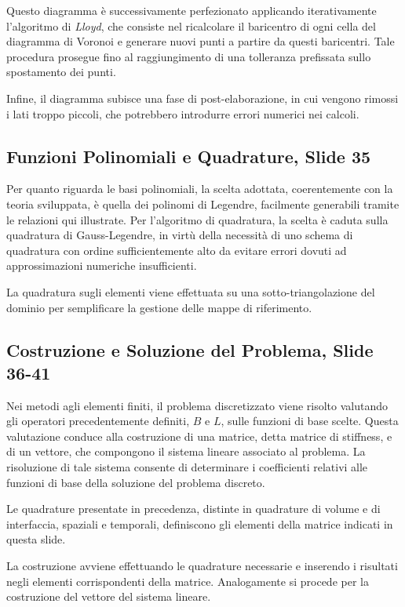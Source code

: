 \documentclass[12pt]{article}
\begin{document}
    Questo diagramma è successivamente perfezionato applicando iterativamente l'algoritmo di \textit{Lloyd}, che consiste nel ricalcolare il baricentro di ogni cella del diagramma di Voronoi e generare nuovi punti a partire da questi baricentri. Tale procedura prosegue fino al raggiungimento di una tolleranza prefissata sullo spostamento dei punti.

    Infine, il diagramma subisce una fase di post-elaborazione, in cui vengono rimossi i lati troppo piccoli, che potrebbero introdurre errori numerici nei calcoli.

    \subsection{Funzioni Polinomiali e Quadrature, Slide 35}

    Per quanto riguarda le basi polinomiali, la scelta adottata, coerentemente con la teoria sviluppata, è quella dei polinomi di Legendre, facilmente generabili tramite le relazioni qui illustrate. Per l'algoritmo di quadratura, la scelta è caduta sulla quadratura di Gauss-Legendre, in virtù della necessità di uno schema di quadratura con ordine sufficientemente alto da evitare errori dovuti ad approssimazioni numeriche insufficienti.

    La quadratura sugli elementi viene effettuata su una sotto-triangolazione del dominio per semplificare la gestione delle mappe di riferimento.

    \subsection{Costruzione e Soluzione del Problema, Slide 36-41}

    Nei metodi agli elementi finiti, il problema discretizzato viene risolto valutando gli operatori precedentemente definiti, $B$ e $L$, sulle funzioni di base scelte. Questa valutazione conduce alla costruzione di una matrice, detta matrice di stiffness, e di un vettore, che compongono il sistema lineare associato al problema. La risoluzione di tale sistema consente di determinare i coefficienti relativi alle funzioni di base della soluzione del problema discreto.

    Le quadrature presentate in precedenza, distinte in quadrature di volume e di interfaccia, spaziali e temporali, definiscono gli elementi della matrice indicati in questa slide.

    La costruzione avviene effettuando le quadrature necessarie e inserendo i risultati negli elementi corrispondenti della matrice. Analogamente si procede per la costruzione del vettore del sistema lineare.
\end{document}
